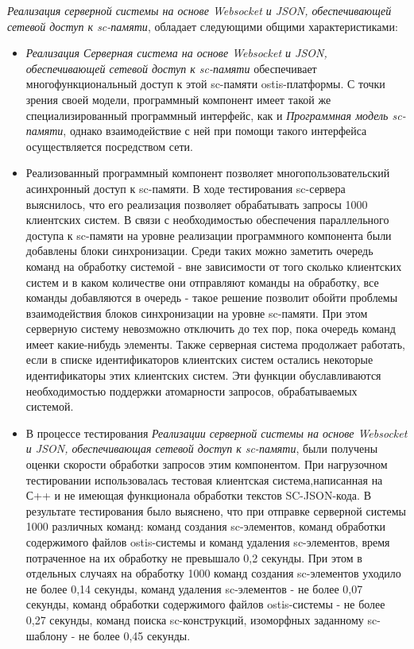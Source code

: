 \textit{Реализация серверной системы на основе Websocket и JSON, обеспечивающей сетевой доступ к sc-памяти}, обладает
следующими общими характеристиками:

\begin{itemize}
	\item \textit{Реализация Серверная система на основе Websocket и JSON, обеспечивающей сетевой доступ к sc-памяти}
    обеспечивает многофункциональный доступ к этой sc-памяти ostis-платформы. С точки зрения своей модели, программный
    компонент имеет такой же специализированный программный интерфейс, как и \textit{Программная модель sc-памяти}, однако
    взаимодействие с ней при помощи такого интерфейса осуществляется посредством сети.
	\item Реализованный программный компонент позволяет многопользовательский асинхронный доступ к sc-памяти. В ходе
    тестирования sc-сервера выяснилось, что его реализация позволяет обрабатывать запросы 1000 клиентских систем.
    В связи с необходимостью обеспечения параллельного доступа к sc-памяти на уровне реализации программного
    компонента были добавлены блоки синхронизации. Среди таких можно заметить очередь команд на обработку системой - вне
    зависимости от того сколько клиентских систем и в каком количестве они отправляют команды на обработку, все команды
    добавляются в очередь - такое решение позволит обойти проблемы взаимодействия блоков синхронизации на уровне sc-памяти.
    При этом серверную систему невозможно отключить до тех пор, пока очередь команд имеет какие-нибудь элементы. Также
    серверная система продолжает работать, если в списке идентификаторов клиентских систем остались некоторые
    идентификаторы этих клиентских систем. Эти функции обуславливаются необходимостью поддержки атомарности запросов,
    обрабатываемых системой.
	\item В процессе тестирования \textit{Реализации серверной системы на основе Websocket и JSON, обеспечивающая
    сетевой доступ к sc-памяти}, были получены оценки скорости обработки запросов этим компонентом. При нагрузочном
    тестировании использовалась тестовая клиентская система,написанная на С++ и не имеющая функционала обработки текстов
    SC-JSON-кода. В результате тестирования было выяснено, что при отправке серверной системы 1000 различных команд: команд
    создания sc-элементов, команд обработки содержимого файлов ostis-системы и команд удаления sc-элементов, время
    потраченное на их обработку не превышало 0,2 секунды. При этом в отдельных случаях на обработку 1000 команд создания
    sc-элементов уходило не более 0,14 секунды, команд удаления sc-элементов - не более 0,07 секунды, команд обработки
    содержимого файлов ostis-системы - не более 0,27 секунды, команд поиска sc-конструкций, изоморфных заданному
    sc-шаблону - не более 0,45 секунды.
\end{itemize}

